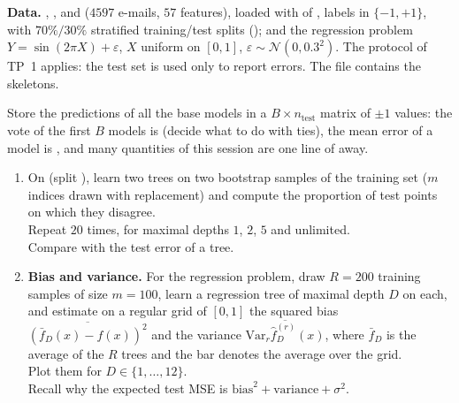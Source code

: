 \documentclass[a4paper,11pt]{article}
\begin{document}
\medskip
\noindent\textbf{Data.} , ,  and  ($4597$ e-mails, $57$ features),
loaded with  of , labels in $\{-1,+1\}$, with $70\%/30\%$ stratified
training/test splits (); and the regression problem $Y=\sin(2\pi X)+\varepsilon$, $X$ uniform on
$[0,1]$, $\varepsilon\sim\mathcal N(0,0.3^2)$. The protocol of TP~1 applies: the test set is used only to report errors.
The file  contains the skeletons.

\begin{tip}
Store the predictions of all the base models in a $B\times n_{\text{test}}$ matrix  of $\pm1$ values: the vote of
the first $B$ models is  (decide what to do with ties), the mean error of a model is
, and many quantities of this session are one line of  away.
\end{tip}

\label{p2:var}

\begin{enumerate}
\item On  (split ), learn two trees on two bootstrap samples of the training set ($m$ indices
      drawn with replacement) and compute the proportion of test points on which they disagree.\\
      Repeat $20$ times, for
      maximal depths $1$, $2$, $5$ and unlimited.\\
      Compare with the test error of a tree.
\item \textbf{Bias and variance.} For the regression problem, draw $R=200$ training samples of size $m=100$, learn a
      regression tree of maximal depth $D$ on each, and estimate on a regular grid of $[0,1]$ the squared bias
      $\overline{(\bar f_D(x)-f(x))^2}$ and the variance $\overline{\mathrm{Var}_r\hat f^{(r)}_D(x)}$, where $\bar f_D$ is the
      average of the $R$ trees and the bar denotes the average over the grid.\\
      Plot them for $D\in\{1,\dots,12\}$.\\
      Recall
      why the expected test MSE is $\text{bias}^2+\text{variance}+\sigma^2$.
\end{enumerate}

\label{p2:bag}
\end{document}
